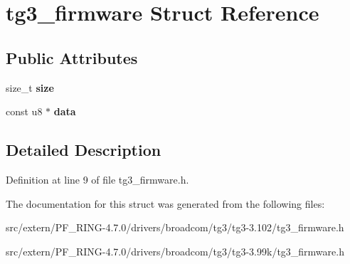 \hypertarget{structtg3__firmware}{
\section{tg3\_\-firmware Struct Reference}
\label{structtg3__firmware}
}
\subsection*{Public Attributes}
\begin{DoxyCompactItemize}
\item 
\hypertarget{structtg3__firmware_a071dcc1506e044705a3ec4296da23ac7}{
size\_\-t {\bfseries size}}
\label{structtg3__firmware_a071dcc1506e044705a3ec4296da23ac7}

\item 
\hypertarget{structtg3__firmware_ac69a4d2c4158903a32fa7cd2bc221fb8}{
const u8 $\ast$ {\bfseries data}}
\label{structtg3__firmware_ac69a4d2c4158903a32fa7cd2bc221fb8}

\end{DoxyCompactItemize}


\subsection{Detailed Description}


Definition at line 9 of file tg3\_\-firmware.h.



The documentation for this struct was generated from the following files:\begin{DoxyCompactItemize}
\item 
src/extern/PF\_\-RING-\/4.7.0/drivers/broadcom/tg3/tg3-\/3.102/tg3\_\-firmware.h\item 
src/extern/PF\_\-RING-\/4.7.0/drivers/broadcom/tg3/tg3-\/3.99k/tg3\_\-firmware.h\end{DoxyCompactItemize}
